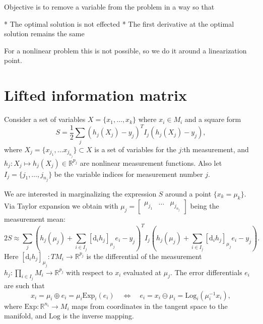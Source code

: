 Objective is to remove a variable from the problem in a way so that

* The optimal solution is not effected
* The first derivative at the optimal solution remains the same

For a nonlinear problem this is not possible, so we do it around a linearization point.

\section{Lifted information matrix}

Consider a set of variables $X = \{ x_1, \ldots, x_k \}$ where $x_i \in M_i$ and a square form
$$
  S = \frac{1}{2} \sum_j \left( h_j(X_j) - y_j \right)^T I_j \left( h_j(X_j) - y_j \right),
$$
where $X_j = \{ x_{j_1}, \ldots x_{j_{n_j}}\} \subset X$ is a set of variables for the $j$:th measurement, and $h_j : X_j \mapsto h_j(X_j) \in \mathbb{R}^{p_j}$ are nonlinear measurement functions. Also let $I_j = \{ j_1, \ldots, j_{n_j} \}$ be the variable indices for measurement number $j$.

We are interested in marginalizing the expression $S$ around a point $\{ x_k = \mu_k \}$. Via Taylor expansion we obtain with $\mu_j = \begin{bmatrix} \mu_{j_1} & \ldots & \mu_{j_{n_j}} \end{bmatrix}$ being the measurement mean:
$$
  2S \approx  \sum_j \left( h_j(\mu_j) + \sum_{i \in I_j} [\mathrm{d}_i h_j]_{\mu_j} e_i - y_j \right)^T I_j \left( h_j(\mu_j) + \sum_{i \in I_j} [\mathrm{d}_i h_j]_{\mu_j} e_i - y_j \right).
$$
Here $[\mathrm{d}_i h_j]_{\mu_j} : T M_i \rightarrow \mathbb{R}^{p_j}$ is the differential of the measurement $h_j: \prod_{i \in I_j} M_i \rightarrow \mathbb{R}^{p_j}$ with respect to $x_i$ evaluated at $\mu_j$. The error differentials $e_i$ are such that
$$
  x_i = \mu_i \oplus e_i = \mu_i \mathrm{Exp}_i(e_i) \quad \Longleftrightarrow \quad e_i = x_i \ominus \mu_i = \textrm{Log}_i (\mu_i^{-1} x_i),
$$
where $\mathrm{Exp} : \mathbb{R}^{n{_i}} \rightarrow M_i$ maps from coordinates in the tangent space to the manifold, and $\mathrm{Log}$ is the inverse mapping.

